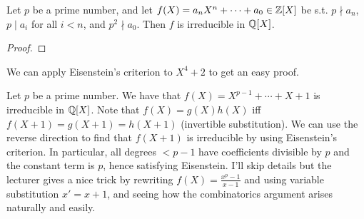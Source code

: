 \begin{theorem}
  Let $p$ be a prime number, and let $f(X)=a_nX^n+\cdots+a_0\in \mathbb Z[X]$ be s.t.
  $p\nmid a_n$, $p\mid a_i$ for all $i<n$, and $p^2\nmid a_0$. Then $f$ is
  irreducible in $\mathbb Q[X]$.
  \label{thm:eisensteinCriterion}
\end{theorem}
\begin{proof}
\end{proof}

\begin{example}
  We can apply Eisenstein's criterion to $X^4+2$ to get an easy proof. 
\end{example}
\begin{example}
  Let $p$ be a prime number. We have that $f(X)=X^{p-1}+\cdots+X+1$ is irreducible in
  $\mathbb Q[X]$. Note that $f(X)=g(X)h(X)$ iff $f(X+1)=g(X+1)=h(X+1)$ (invertible
  substitution). We can use the reverse direction to find that $f(X+1)$ is irreducible by
  using Eisenstein's criterion. In particular, all degrees $<p-1$ have coefficients
  divisible by $p$ and the constant term is $p$, hence satisfying Eisenstein. I'll skip
  details but the lecturer gives a nice trick by rewriting $f(X)=\frac{x^p-1}{x-1}$ and
  using variable substitution $x'=x+1$, and seeing how the combinatorics argument arises
  naturally and easily.
\end{example}
